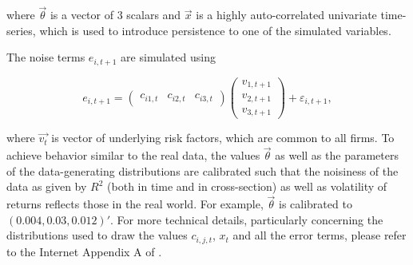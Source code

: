 		where $\vec{\theta}$ is a vector of 3 scalars and $\vec{x}$ is a highly auto-correlated univariate time-series, which is used to introduce persistence to one of the simulated variables.   
		
		The noise terms $e_{i,t+1}$ are simulated using 
		
		\begin{equation*}
			e_{i,t+1} = \begin{pmatrix} c_{i1,t} & c_{i2,t} & c_{i3,t} \end{pmatrix} \begin{pmatrix} v_{1,t+1} \\ v_{2,t+1} \\ v_{3,t+1}  \end{pmatrix} + \varepsilon_{i,t+1},
		\end{equation*}  
		
		where $\vec{v_t}$ is vector of underlying risk factors, which are common to all firms. To achieve behavior similar to the real data, the values $\vec{\theta}$ as well as the parameters of the data-generating distributions are calibrated such that the noisiness of the data as given by $R^2$ (both in time and in cross-section) as well as volatility of returns reflects those in the real world. For example, $\vec{\theta}$ is calibrated to $(0.004, 0.03, 0.012)'$. For more technical details, particularly concerning the distributions used to draw the values $c_{i,j,t}$, $x_t$  and all the error terms, please refer to the Internet Appendix A of \cite{gu2020empirical}. 
		
		  
	
	
	
	
	
	
	
	
	
	
	
	
	
	